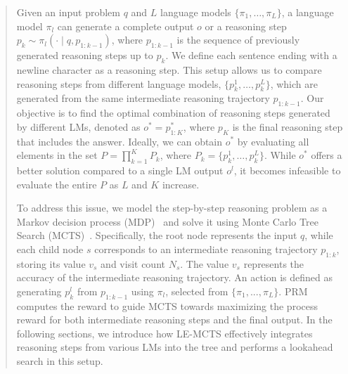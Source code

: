 \documentclass[11pt]{article}
\begin{document}
\begin{abstract}
Given an input problem \( q \) and \( L \) language models \( \{\pi_1, \dots, \pi_L\} \), a language model \( \pi_l \) can generate a complete output \( o \) or a reasoning step \( p_k \sim \pi_l(\cdot \mid q, p_{1:k-1}) \), where \( p_{1:k-1} \) is the sequence of previously generated reasoning steps up to \( p_k \). 
We define each sentence ending with a newline character as a reasoning step.
This setup allows us to compare reasoning steps from different language models, \( \{p^1_k, \dots, p^L_k\} \), which are generated from the same intermediate reasoning trajectory \( p_{1:k-1} \). 
Our objective is to find the optimal combination of reasoning steps generated by different LMs, denoted as \( o^* = p^*_{1:K} \), where \( p_K \) is the final reasoning step that includes the answer. 
Ideally, we can obtain \( o^* \) by evaluating all elements in the set \( P = \prod^{K}_{k=1} P_k \), where \( P_k = \{p^1_k, \dots, p^L_k\} \).
While \( o^* \) offers a better solution compared to a single LM output \( o^l \), it becomes infeasible to evaluate the entire \( P \) as \( L \) and \( K \) increase. 

To address this issue, we model the step-by-step reasoning problem as a Markov decision process (MDP)~\citep{bellman-etal-1957-mdp} and solve it using Monte Carlo Tree Search (MCTS)~\citep{coulom-etal-2006-mcts}. 
Specifically, the root node represents the input \( q \), while each child node \( s \) corresponds to an intermediate reasoning trajectory \( p_{1:k} \), storing its value \( v_s \) and visit count \( N_s \).
The value \( v_s \) represents the accuracy of the intermediate reasoning trajectory.
An action is defined as generating \( p^l_k \) from \( p_{1:k-1} \) using \( \pi_l \), selected from \(\{\pi_1,...,\pi_L\}\). 
PRM computes the reward to guide MCTS towards maximizing the process reward for both intermediate reasoning steps and the final output.
In the following sections, we introduce how LE-MCTS effectively integrates reasoning steps from various LMs into the tree and performs a lookahead search in this setup.


\end{abstract}
\end{document}
